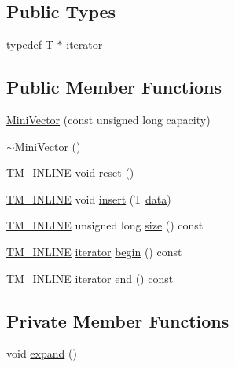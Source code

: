 \subsection*{Public Types}
\begin{DoxyCompactItemize}
\item 
typedef T $\ast$ \hyperlink{classstm_1_1MiniVector_aa5998549c20eb0d6fac9bee27b4f0024}{iterator}
\end{DoxyCompactItemize}
\subsection*{Public Member Functions}
\begin{DoxyCompactItemize}
\item 
\hyperlink{classstm_1_1MiniVector_a7983427989e1d868d70475eb9b1018a1}{Mini\-Vector} (const unsigned long capacity)
\item 
\hyperlink{classstm_1_1MiniVector_a335a372abb7c3871076a13667cef0588}{$\sim$\-Mini\-Vector} ()
\item 
\hyperlink{platform_8hpp_abdc8d70d196a73a2a119efdbe674ecf8}{T\-M\-\_\-\-I\-N\-L\-I\-N\-E} void \hyperlink{classstm_1_1MiniVector_ad17f9c76202d399264ba62812f0b5c41}{reset} ()
\item 
\hyperlink{platform_8hpp_abdc8d70d196a73a2a119efdbe674ecf8}{T\-M\-\_\-\-I\-N\-L\-I\-N\-E} void \hyperlink{classstm_1_1MiniVector_ac2a0e4cb478962dfc435dcc861793f02}{insert} (T \hyperlink{structdata}{data})
\item 
\hyperlink{platform_8hpp_abdc8d70d196a73a2a119efdbe674ecf8}{T\-M\-\_\-\-I\-N\-L\-I\-N\-E} unsigned long \hyperlink{classstm_1_1MiniVector_a2b30e4feb605f230ca17dec2b39fe472}{size} () const 
\item 
\hyperlink{platform_8hpp_abdc8d70d196a73a2a119efdbe674ecf8}{T\-M\-\_\-\-I\-N\-L\-I\-N\-E} \hyperlink{classstm_1_1MiniVector_aa5998549c20eb0d6fac9bee27b4f0024}{iterator} \hyperlink{classstm_1_1MiniVector_a4d707e1115e162943b4709a2af92ed77}{begin} () const 
\item 
\hyperlink{platform_8hpp_abdc8d70d196a73a2a119efdbe674ecf8}{T\-M\-\_\-\-I\-N\-L\-I\-N\-E} \hyperlink{classstm_1_1MiniVector_aa5998549c20eb0d6fac9bee27b4f0024}{iterator} \hyperlink{classstm_1_1MiniVector_ae2297c706ac2ebee161ef60ace9ae645}{end} () const 
\end{DoxyCompactItemize}
\subsection*{Private Member Functions}
\begin{DoxyCompactItemize}
\item 
void \hyperlink{classstm_1_1MiniVector_a94cd17b5d364819e4799751f98a5a5c6}{expand} ()
\end{DoxyCompactItemize}
